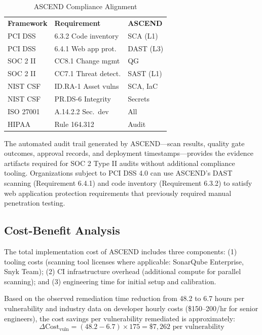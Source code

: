 \documentclass[journal]{IEEEtran}
\begin{document}
\begin{table}[h]
\centering
\caption{ASCEND Compliance Alignment}
\label{tab:compliance}
\scriptsize
\begin{tabular}{@{}llp{1.5cm}@{}}
\rowcolor{TableHeader}\color{white}\textbf{Framework} & \color{white}\textbf{Requirement} & \color{white}\textbf{ASCEND} \\
\rowcolor{IEEELightBlue}PCI DSS & 6.3.2 Code inventory & SCA (L1) \\
\rowcolor{TableAlt}PCI DSS & 6.4.1 Web app prot. & DAST (L3) \\
\rowcolor{IEEELightBlue}SOC 2 II & CC8.1 Change mgmt & QG \\
\rowcolor{TableAlt}SOC 2 II & CC7.1 Threat detect. & SAST (L1) \\
\rowcolor{IEEELightBlue}NIST CSF & ID.RA-1 Asset vulns & SCA, IaC \\
\rowcolor{TableAlt}NIST CSF & PR.DS-6 Integrity & Secrets \\
\rowcolor{IEEELightBlue}ISO 27001 & A.14.2.2 Sec.~dev & All \\
\rowcolor{TableAlt}HIPAA & Rule 164.312 & Audit \\
\end{tabular}
\end{table}

The automated audit trail generated by ASCEND---scan results, quality gate outcomes, approval records, and deployment timestamps---provides the evidence artifacts required for SOC 2 Type II audits without additional compliance tooling. Organizations subject to PCI DSS 4.0 can use ASCEND's DAST scanning (Requirement 6.4.1) and code inventory (Requirement 6.3.2) to satisfy web application protection requirements that previously required manual penetration testing.

\subsection{Cost-Benefit Analysis}

The total implementation cost of ASCEND includes three components: (1) tooling costs (scanning tool licenses where applicable: SonarQube Enterprise, Snyk Team); (2) CI infrastructure overhead (additional compute for parallel scanning); and (3) engineering time for initial setup and calibration.

Based on the observed remediation time reduction from 48.2 to 6.7 hours per vulnerability and industry data on developer hourly costs (\$150--200/hr for senior engineers), the cost savings per vulnerability remediated is approximately:
\begin{equation}
\Delta\text{Cost}_{\text{vuln}} = (48.2 - 6.7) \times 175 = \$7{,}262 \text{ per vulnerability}
\label{eq:cost}
\end{equation}
\end{document}
